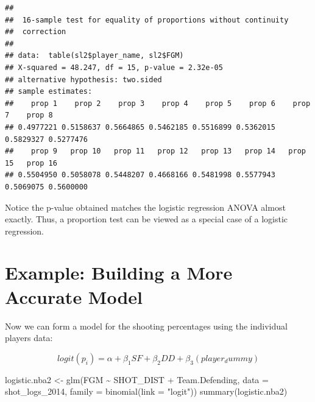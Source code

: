 \documentclass[
]{book}
\newenvironment{Shaded}{\begin{snugshade}}{\end{snugshade}}
\newcommand{\AttributeTok}[1]{\textcolor[rgb]{0.77,0.63,0.00}{#1}}
\newcommand{\FunctionTok}[1]{\textcolor[rgb]{0.00,0.00,0.00}{#1}}
\newcommand{\NormalTok}[1]{#1}
\newcommand{\OtherTok}[1]{\textcolor[rgb]{0.56,0.35,0.01}{#1}}
\newcommand{\SpecialCharTok}[1]{\textcolor[rgb]{0.00,0.00,0.00}{#1}}
\newcommand{\StringTok}[1]{\textcolor[rgb]{0.31,0.60,0.02}{#1}}
\theoremstyle{definition}
\theoremstyle{definition}
\theoremstyle{definition}
\theoremstyle{definition}
\theoremstyle{remark}
\begin{document}
\begin{verbatim}
## 
##  16-sample test for equality of proportions without continuity
##  correction
## 
## data:  table(sl2$player_name, sl2$FGM)
## X-squared = 48.247, df = 15, p-value = 2.32e-05
## alternative hypothesis: two.sided
## sample estimates:
##    prop 1    prop 2    prop 3    prop 4    prop 5    prop 6    prop 7    prop 8 
## 0.4977221 0.5158637 0.5664865 0.5462185 0.5516899 0.5362015 0.5829327 0.5277476 
##    prop 9   prop 10   prop 11   prop 12   prop 13   prop 14   prop 15   prop 16 
## 0.5504950 0.5058078 0.5448207 0.4668166 0.5481998 0.5577943 0.5069075 0.5600000
\end{verbatim}

Notice the p-value obtained matches the logistic regression ANOVA almost exactly. Thus, a proportion test can be viewed as a special case of a logistic regression.

\hypertarget{example-building-a-more-accurate-model}{%
\section{Example: Building a More Accurate Model}\label{example-building-a-more-accurate-model}}

Now we can form a model for the shooting percentages using the individual players data:

\[ logit(p_i)=\alpha+\beta_1 SF+\beta_{2} DD+\beta_3 (player_dummy) \]

\begin{Shaded}
\begin{Highlighting}[]
\NormalTok{logistic.nba2 }\OtherTok{\textless{}{-}} \FunctionTok{glm}\NormalTok{(FGM }\SpecialCharTok{\textasciitilde{}}\NormalTok{ SHOT\_DIST }\SpecialCharTok{+}\NormalTok{ Team.Defending, }\AttributeTok{data =}\NormalTok{ shot\_logs\_2014, }\AttributeTok{family =} \FunctionTok{binomial}\NormalTok{(}\AttributeTok{link =} \StringTok{"logit"}\NormalTok{))}
\FunctionTok{summary}\NormalTok{(logistic.nba2)}
\end{Highlighting}
\end{Shaded}
\end{document}
